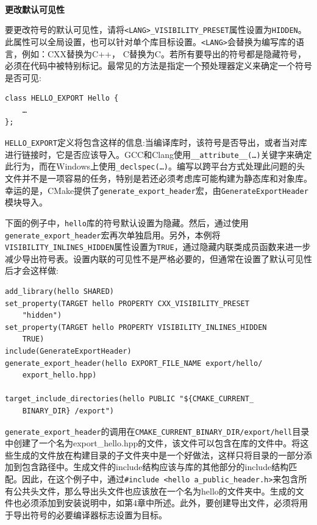 \hspace*{\fill} \\ %
\noindent
\textbf{更改默认可见性}

要更改符号的默认可见性，请将\texttt{<LANG>\_VISIBILITY\_PRESET}属性设置为\texttt{HIDDEN}。此属性可以全局设置，也可以针对单个库目标设置。\texttt{<LANG>}会替换为编写库的语言，例如：CXX替换为C++， C替换为C。若所有要导出的符号都是隐藏符号，必须在代码中被特别标记。最常见的方法是指定一个预处理器定义来确定一个符号是否可见:

\begin{lstlisting}[style=styleCXX]
class HELLO_EXPORT Hello {
	…
};
\end{lstlisting}

\texttt{HELLO\_EXPORT}定义将包含这样的信息:当编译库时，该符号是否导出，或者当对库进行链接时，它是否应该导入。GCC和Clang使用\texttt{\_\_attribute\_\_(…)}关键字来确定此行为，而在Windows上使用\texttt{\_declspec(…)}。编写以跨平台方式处理此问题的头文件并不是一项容易的任务，特别是若还必须考虑库可能构建为静态库和对象库。幸运的是，CMake提供了\texttt{generate\_export\_header}宏，由\texttt{GenerateExportHeader}模块导入。

下面的例子中，\texttt{hello}库的符号默认设置为隐藏。然后，通过使用\texttt{generate\_export\_header}宏再次单独启用。另外，本例将\texttt{VISIBILITY\_INLINES\_HIDDEN}属性设置为\texttt{TRUE}，通过隐藏内联类成员函数来进一步减少导出符号表。设置内联的可见性不是严格必要的，但通常在设置了默认可见性后才会这样做:

\begin{lstlisting}[style=styleCMake]
add_library(hello SHARED)
set_property(TARGET hello PROPERTY CXX_VISIBILITY_PRESET
	"hidden")
set_property(TARGET hello PROPERTY VISIBILITY_INLINES_HIDDEN
	TRUE)
include(GenerateExportHeader)
generate_export_header(hello EXPORT_FILE_NAME export/hello/
	export_hello.hpp)

target_include_directories(hello PUBLIC "${CMAKE_CURRENT_
	BINARY_DIR} /export")
\end{lstlisting}

\texttt{generate\_export\_header}的调用在\texttt{CMAKE\_CURRENT\_BINARY\_DIR/export/hell}目录中创建了一个名为export\_hello.hpp的文件，该文件可以包含在库的文件中。将这些生成的文件放在构建目录的子文件夹中是一个好做法，这样只将目录的一部分添加到包含路径中。生成文件的include结构应该与库的其他部分的include结构匹配。因此，在这个例子中，通过\texttt{\#include <hello a\_public\_header.h>}来包含所有公共头文件，那么导出头文件也应该放在一个名为hello的文件夹中。生成的文件也必须添加到安装说明中，如第4章中所述。此外，要创建导出文件，必须将用于导出符号的必要编译器标志设置为目标。

